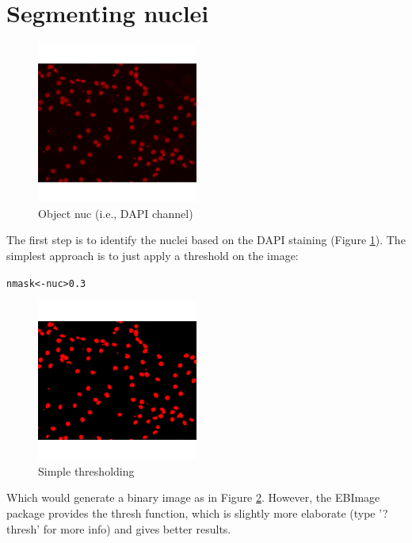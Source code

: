 \documentclass{article}\usepackage[]{graphicx}\usepackage[]{color}
\makeatletter
\newcommand{\hlnum}[1]{\textcolor[rgb]{0.686,0.059,0.569}{#1}}%
\newcommand{\hlopt}[1]{\textcolor[rgb]{0,0,0}{#1}}%
\newcommand{\hlstd}[1]{\textcolor[rgb]{0.345,0.345,0.345}{#1}}%
\newcommand{\hlkwb}[1]{\textcolor[rgb]{0.69,0.353,0.396}{#1}}%
\newenvironment{kframe}{%
 \def\at@end@of@kframe{}%
 \ifinner\ifhmode%
  \def\at@end@of@kframe{\end{minipage}}%
  \begin{minipage}{\columnwidth}%
 \fi\fi%
 \def\FrameCommand##1{\hskip\@totalleftmargin \hskip-\fboxsep
 \colorbox{shadecolor}{##1}\hskip-\fboxsep
     \hskip-\linewidth \hskip-\@totalleftmargin \hskip\columnwidth}%
 \MakeFramed {\advance\hsize-\width
   \@totalleftmargin\z@ \linewidth\hsize
   \@setminipage}}%
 {\par\unskip\endMakeFramed%
 \at@end@of@kframe}
\newenvironment{knitrout}{}{} %
\makeatother
\begin{document}
\section{Segmenting nuclei}
\begin{knitrout}
\color{fgcolor}\begin{figure}

{\centering \includegraphics[width=200px]{knit_figure/figdapi-1} 

}

\caption[Object nuc (i.e., DAPI channel)]{Object nuc (i.e., DAPI channel)}\label{fig:dapi}
\end{figure}


\end{knitrout}
The first step is to identify the nuclei based on the DAPI staining (Figure \ref{fig:dapi}).
The simplest approach is to just apply a threshold on the image:
\begin{knitrout}
\color{fgcolor}\begin{kframe}
\begin{alltt}
\hlstd{nmask} \hlkwb{<-} \hlstd{nuc} \hlopt{>} \hlnum{0.3}
\end{alltt}
\end{kframe}\begin{figure}

{\centering \includegraphics[width=200px]{knit_figure/figsimp_thr-1} 

}

\caption[Simple thresholding]{Simple thresholding}\label{fig:simp.thr}
\end{figure}


\end{knitrout}
Which would generate a binary image as in Figure \ref{fig:simp.thr}.
However, the EBImage package provides the thresh function, which is slightly more elaborate (type '?thresh' for more info) and gives better results.
\end{document}
